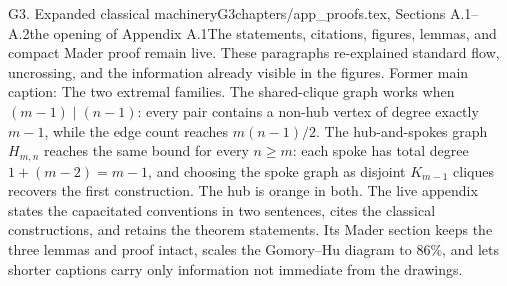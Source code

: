 \begin{offcutrewrite}{G3. Expanded classical machinery}{G3}{chapters/app\_proofs.tex, Sections A.1--A.2}{the opening of Appendix A.1}{The statements, citations, figures, lemmas, and compact Mader proof remain live. These paragraphs re-explained standard flow, uncrossing, and the information already visible in the figures.}
Former main caption: The two extremal families. The shared-clique graph works when $(m-1)\mid(n-1)$: every pair contains a non-hub vertex of degree exactly $m-1$, while the edge count reaches $m(n-1)/2$. The hub-and-spokes graph $H_{m,n}$ reaches the same bound for every $n\ge m$: each spoke has total degree $1+(m-2)=m-1$, and choosing the spoke graph as disjoint $K_{m-1}$ cliques recovers the first construction. The hub is orange in both.
\nowreads
The live appendix states the capacitated conventions in two sentences, cites the classical constructions, and retains the theorem statements. Its Mader section keeps the three lemmas and proof intact, scales the Gomory--Hu diagram to $86\%$, and lets shorter captions carry only information not immediate from the drawings.
\end{offcutrewrite}

